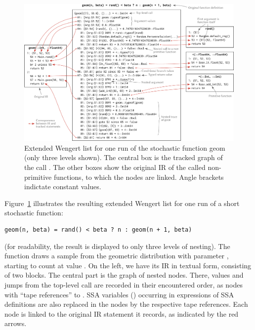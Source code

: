 \begin{figure}[t]
  \centering
  \includegraphics[width=\textwidth]{figures/extended-wengert-list}
  \caption{Extended Wengert list for one run of the stochastic function geom (only three levels
    shown). The central box is the tracked graph of the call \protect{}. The other
    boxes show the original IR of the called non-primitive functions, to which the nodes are
    linked.  Angle brackets indictate constant values.}
  \label{fig:ext-wengert-list}
\end{figure}

Figure~\ref{fig:ext-wengert-list} illustrates the resulting extended Wengert list for one run of a
short stochastic function:
\begin{lstlisting}
geom(n, beta) = rand() < beta ? n : geom(n + 1, beta)
\end{lstlisting}
(for readability, the result is displayed to only three levels of nesting).  The function draws a
sample from the geometric distribution with parameter , starting to count at value
. On the left, we have its IR in textual form, consisting of two blocks. The central part
is the graph of nested nodes.  There, values and jumps from the top-level call are recorded in their
encountered order, as nodes with \enquote{tape references}  to . SSA variables
() occurring in expressions of SSA definitions are also replaced in the nodes by the
respective tape references.  Each node is linked to the original IR statement it records, as
indicated by the red arrows.

